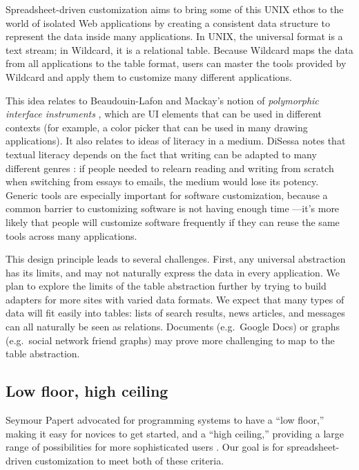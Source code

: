 \documentclass[english]{programming}
\begin{document}
Spreadsheet-driven customization aims to bring some of this UNIX ethos
to the world of isolated Web applications by creating a consistent data
structure to represent the data inside many applications. In UNIX, the
universal format is a text stream; in Wildcard, it is a relational
table. Because Wildcard maps the data from all applications to the table
format, users can master the tools provided by Wildcard and apply them
to customize many different applications.

This idea relates to Beaudouin-Lafon and Mackay's notion of
\emph{polymorphic interface instruments} \autocite{beaudouin-lafon2000},
which are UI elements that can be used in different contexts (for
example, a color picker that can be used in many drawing applications).
It also relates to ideas of literacy in a medium. DiSessa notes that
textual literacy depends on the fact that writing can be adapted to many
different genres \autocite{disessa2000}: if people needed to relearn
reading and writing from scratch when switching from essays to emails,
the medium would lose its potency. Generic tools are especially
important for software customization, because a common barrier to
customizing software is not having enough time
\autocite{mackay1991}---it's more likely that people will customize
software frequently if they can reuse the same tools across many
applications.

This design principle leads to several challenges. First, any universal
abstraction has its limits, and may not naturally express the data in
every application. We plan to explore the limits of the table
abstraction further by trying to build adapters for more sites with
varied data formats. We expect that many types of data will fit easily
into tables: lists of search results, news articles, and messages can
all naturally be seen as relations. Documents (e.g.~Google Docs) or
graphs (e.g.~social network friend graphs) may prove more challenging to
map to the table abstraction.

\hypertarget{low-floor-high-ceiling}{%
\subsection{Low floor, high ceiling}\label{low-floor-high-ceiling}}

Seymour Papert advocated for programming systems to have a ``low
floor,'' making it easy for novices to get started, and a ``high
ceiling,'' providing a large range of possibilities for more
sophisticated users \autocite{resnick2016}. Our goal is for
spreadsheet-driven customization to meet both of these criteria.
\end{document}
